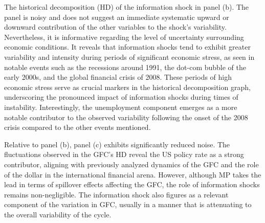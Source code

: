\documentclass[11pt,a4paper]{article}
\begin{document}
The historical decomposition (HD) of the information shock in panel (b).
The panel is noisy and does not suggest an immediate systematic upward or downward contribution of the other variables to the shock's variability. 
Nevertheless, it is informative regarding the level of uncertainty surrounding economic conditions. 
It reveals that information shocks tend to exhibit greater variability and intensity during periods of significant economic stress, as seen in notable events such as the recessions around 1991, the dot-com bubble of the early 2000s, and the global financial crisis of 2008. These periods of high economic stress serve as crucial markers in the historical decomposition graph, underscoring the pronounced impact of information shocks during times of instability.
Interestingly, the unemployment component emerges as a more notable contributor to the observed variability following the onset of the 2008 crisis compared to the other events mentioned. %




Relative to panel (b), panel (c) exhibits significantly reduced noise. 
The fluctuations observed in the GFC's HD reveal the US policy rate as a strong contributor, aligning with previously analyzed dynamics of the GFC and the role of the dollar in the international financial arena. 
However, although MP takes the lead in terms of spillover effects affecting the GFC, the role of information shocks remains non-negligible.
The information shock also figures as a relevant component of the variation in GFC, usually in a manner that is attenuating to the overall variability of the cycle. %
\end{document}
